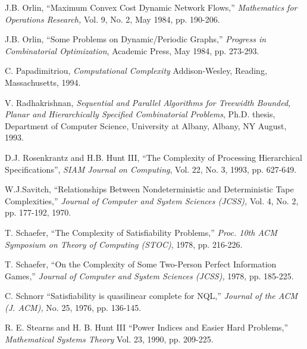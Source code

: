 \begin{thebibliography}{HMRR93}
 J.B. Orlin,
``Maximum Convex Cost  Dynamic Network Flows,''
{\em Mathematics for Operations Research,}
Vol. 9, No. 2, May 1984, pp. 190-206.


 J.B. Orlin,
``Some Problems on Dynamic/Periodic Graphs,''
{\em Progress in Combinatorial Optimization},
Academic Press, May 1984, pp. 273-293.



\iffalse******
\bibitem[PY91]{PY91} C. Papadimitriou and M. Yannakakis,
``Optimization, Approximation and Complexity Classes,''
{\em Journal of Computer and System Sciences (JCSS)}, 
No. 43, 1991, pp. 425-440.
************
\fi


C. Papadimitriou,
{\em Computational Complexity}
Addison-Wesley, Reading, Massachusetts, 1994.




 V. Radhakrishnan,
{\em Sequential and Parallel Algorithms for Treewidth Bounded, Planar
and Hierarchically Specified Combinatorial Problems},
 Ph.D. thesis, Department of Computer Science, 
University at Albany,  Albany, NY August, 1993.


	
 D.J. Rosenkrantz and H.B. Hunt III,
``The Complexity of Processing Hierarchical Specifications'',
{\em SIAM Journal on Computing}, 
Vol. 22, No. 3, 1993, pp. 627-649.





W.J.Savitch, 
``Relationships Between Nondeterministic and Deterministic 
Tape Complexities,'' {\em Journal of Computer and System Sciences (JCSS),} 
Vol. 4, No. 2, pp. 177-192, 1970.


T. Schaefer,
``The Complexity of Satisfiability Problems,''
{\em Proc. 10th ACM Symposium on Theory of Computing (STOC)}, 
1978, pp. 216-226.


T. Schaefer,
``On the Complexity of Some Two-Person Perfect Information Games,''
{\em Journal of Computer and System Sciences (JCSS),} 
1978, pp. 185-225.



 C. Schnorr
``Satisfiability is quasilinear complete for NQL,''
{\em Journal of the ACM (J. ACM),} 
No. 25, 1976, pp. 136-145.


	
 R. E. Stearns and H. B. Hunt III
``Power Indices and Easier Hard Problems,''
{\em Mathematical Systems Theory}
Vol. 23, 1990, pp. 209-225.


\end{thebibliography}
